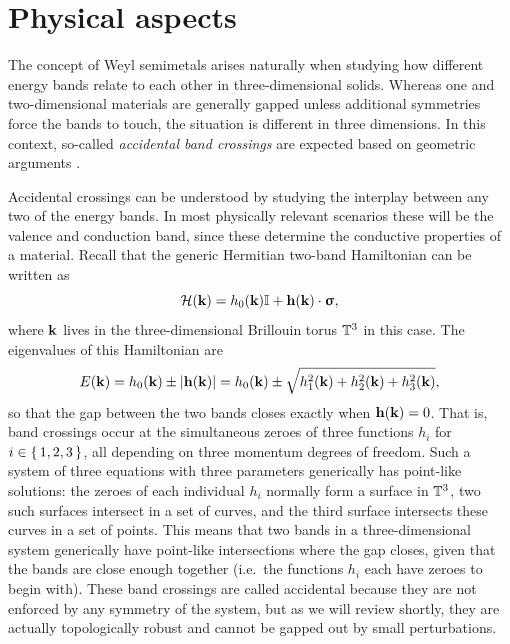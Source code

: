 \section{Physical aspects}\label{sec:semimetal-physics}

The concept of Weyl semimetals arises naturally when studying how different energy bands relate to each other in three-dimensional solids. Whereas one and two-dimensional materials are generally gapped unless additional symmetries force the bands to touch, the situation is different in three dimensions. In this context, so-called \emph{accidental band crossings} are expected based on geometric arguments \cite{Herring_Accidental}.

Accidental crossings can be understood by studying the interplay between any two of the energy bands. In most physically relevant scenarios these will be the valence and conduction band, since these determine the conductive properties of a material. Recall that the generic Hermitian two-band Hamiltonian can be written as
\begin{equation*}
	\mathcal{H}(\vb{k}) = h_0(\vb{k})\mathbb{I} + \vb{h}(\vb{k})\cdot\bm{\upsigma},
\end{equation*}
where $\vb{k}$ lives in the three-dimensional Brillouin torus $\mathbb{T}^3$ in this case. The eigenvalues of this Hamiltonian are
\begin{equation*}
	E(\vb{k}) = h_0(\vb{k}) \pm \abs{\vb{h}(\vb{k})} = h_0(\vb{k}) \pm \sqrt{h_1^2(\vb{k}) + h_2^2(\vb{k}) + h_3^2(\vb{k})},
\end{equation*}
so that the gap between the two bands closes exactly when $\vb{h}(\vb{k}) = 0$. That is, band crossings occur at the simultaneous zeroes of three functions $h_i$ for $i\in\set{1,2,3}$, all depending on three momentum degrees of freedom. Such a system of three equations with three parameters generically has point-like solutions: the zeroes of each individual $h_i$ normally form a surface in $\mathbb{T}^3$, two such surfaces intersect in a set of curves, and the third surface intersects these curves in a set of points. This means that two bands in a three-dimensional system generically have point-like intersections where the gap closes, given that the bands are close enough together (i.e.\ the functions $h_i$ each have zeroes to begin with). %
These band crossings are called accidental because they are not enforced by any symmetry of the system, but as we will review shortly, they are actually topologically robust and cannot be gapped out by small perturbations.

